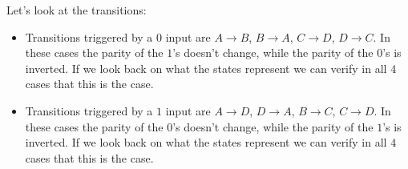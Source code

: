 Let's look at the transitions:

\begin{itemize}
    \item Transitions triggered by a $0$ input are $A\rightarrow{}B$, $B\rightarrow{}A$, $C\rightarrow{}D$, $D\rightarrow{}C$. In these cases the parity of the $1$'s doesn't change, while the parity of the $0$'s is inverted. If we look back on what the states represent we can verify in all $4$ cases that this is the case.
    \item Transitions triggered by a $1$ input are $A\rightarrow{}D$, $D\rightarrow{}A$, $B\rightarrow{}C$, $C\rightarrow{}D$. In these cases the parity of the $0$'s doesn't change, while the parity of the $1$'s is inverted. If we look back on what the states represent we can verify in all $4$ cases that this is the case.
\end{itemize}